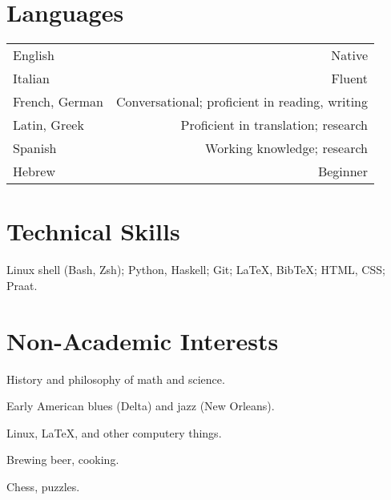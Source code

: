 \documentclass[11pt,letterpaper,twoside]{article}
\makeatletter
\newenvironment{cvsection}{%
  \setlength{\extrarowheight}{1ex}
  \begin{longtable}[l]{@{} L R @{}}
}{%
  \end{longtable}
}
\makeatother
\begin{document}
\section*{Languages}

\begin{cvsection}
  English & Native\\
  Italian & Fluent\\
  French, German & Conversational; proficient in reading, writing\\
  Latin, Greek & Proficient in translation; research\\
  Spanish & Working knowledge; research\\
  Hebrew & Beginner\\
\end{cvsection}

\section*{Technical Skills}

Linux shell (Bash, Zsh); Python, Haskell; Git; \LaTeX, Bib\TeX; HTML, CSS; Praat.

\section*{Non-Academic Interests}

\begin{list}{}{\leftmargin=0pt}
  \item History and philosophy of math and science.
  \item Early American blues (Delta) and jazz (New Orleans).
  \item Linux, \LaTeX{}, and other computery things.
  \item Brewing beer, cooking.
  \item Chess, puzzles.
\end{list}
\end{document}
